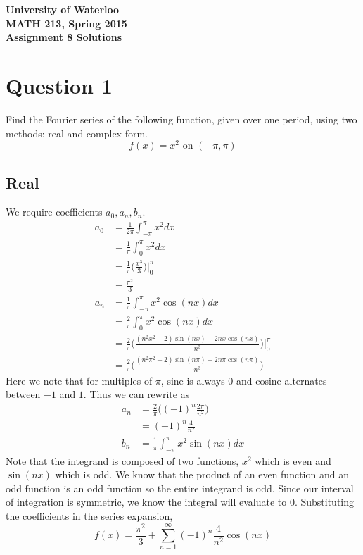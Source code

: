 \documentclass[12pt]{article}
\begin{document}
\begin{center}
{\Large\bf University of Waterloo}\\
\vspace{3mm}
{\Large\bf MATH 213, Spring 2015}\\
\vspace{2mm}
{\Large\bf Assignment 8 Solutions}\\
\end{center}

\section*{Question 1}
Find the Fourier series of the following function, given over one period, using two methods: real and complex form.
$$f(x) = x^2 \text{ on } (-\pi, \pi)$$

\subsection*{Real}
We require coefficients $a_0, a_n, b_n$.
\begin{align*}
  a_0 &= \frac{1}{2\pi}\int_{-\pi}^{\pi}x^2 dx \\
  &= \frac{1}{\pi}\int_{0}^{\pi}x^2 dx \tag{even integrand} \\
  &= \frac{1}{\pi} \bigg(\frac{x^3}{3}\bigg) \bigg|_0^{\pi} \\
  &= \frac{\pi^2}{3} \\
  a_n &= \frac{1}{\pi}\int_{-\pi}^{\pi}x^2\cos(nx) dx \\
  &= \frac{2}{\pi}\int_{0}^{\pi}x^2\cos(nx) dx \tag{even integrand} \\
  &= \frac{2}{\pi} \bigg( \frac{(n^2x^2-2)\sin(nx) + 2nx\cos(nx)}{n^3}\bigg) \bigg|_0^{\pi} \\
  &= \frac{2}{\pi} \bigg( \frac{(n^2\pi^2-2)\sin(n\pi) + 2n\pi\cos(n\pi)}{n^3}\bigg)
\end{align*}
Here we note that for multiples of $\pi$, sine is always 0 and cosine alternates between $-1$ and $1$. Thus we can rewrite as
\begin{align*}
  a_n &= \frac{2}{\pi} \bigg( (-1)^n \frac{2\pi}{n^2}\bigg) \\
  &= (-1)^n \frac{4}{n^2} \\
  b_n &= \frac{1}{\pi}\int_{-\pi}^{\pi}x^2\sin(nx) dx
\end{align*}
Note that the integrand is composed of two functions, $x^2$ which is even and $\sin(nx)$ which is odd. We know that the product of an even function and an odd function is an odd function so the entire integrand is odd. Since our interval of integration is symmetric, we know the integral will evaluate to $0$.
Substituting the coefficients in the series expansion, $$f(x) = \frac{\pi^2}{3} + \sum_{n=1}^{\infty} (-1)^n \frac{4}{n^2} \cos(nx)$$
\end{document}
